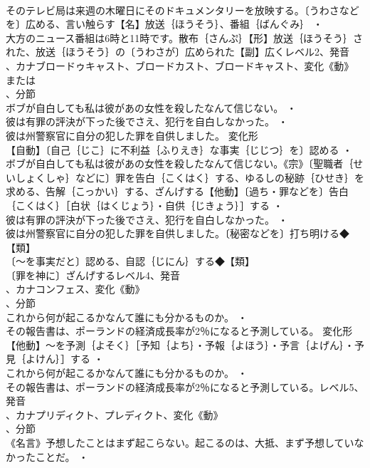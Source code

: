 \documentclass[8pt]{extreport}
\begin{document}
\begin{CJK}{UTF8}{min}
\\	そのテレビ局は来週の木曜日にそのドキュメンタリーを放映する。〔うわさなどを〕広める、言い触らす【名】放送｛ほうそう｝、番組｛ばんぐみ｝ ・
\\	大方のニュース番組は6時と11時です。散布｛さんぷ｝【形】放送｛ほうそう｝された、放送｛ほうそう｝の〔うわさが〕広められた【副】広くレベル2、発音
\\	、カナブロードゥキャスト、ブロードカスト、ブロードキャスト、変化《動》
\\	または
\\	、分節
\\	ボブが自白しても私は彼があの女性を殺したなんて信じない。 ・
\\	彼は有罪の評決が下った後でさえ、犯行を自白しなかった。 ・
\\	彼は州警察官に自分の犯した罪を自供しました。	変化形 
\\	【自動】〔自己｛じこ｝に不利益｛ふりえき｝な事実｛じじつ｝を〕認める ・
\\	ボブが自白しても私は彼があの女性を殺したなんて信じない。《宗》〔聖職者｛せいしょくしゃ｝などに〕罪を告白｛こくはく｝する、ゆるしの秘跡｛ひせき｝を求める、告解｛こっかい｝する、ざんげする【他動】〔過ち・罪などを〕告白｛こくはく｝［白状｛はくじょう｝・自供｛じきょう｝］する ・
\\	彼は有罪の評決が下った後でさえ、犯行を自白しなかった。 ・
\\	彼は州警察官に自分の犯した罪を自供しました。〔秘密などを〕打ち明ける◆【類】
\\	〔～を事実だと〕認める、自認｛じにん｝する◆【類】
\\	〔罪を神に〕ざんげするレベル4、発音
\\	、カナコンフェス、変化《動》
\\	、分節
\\	これから何が起こるかなんて誰にも分かるものか。 ・
\\	その報告書は、ポーランドの経済成長率が2％になると予測している。	変化形 
\\	【他動】～を予測｛よそく｝［予知｛よち｝・予報｛よほう｝・予言｛よげん｝・予見｛よけん｝］する ・
\\	これから何が起こるかなんて誰にも分かるものか。 ・
\\	その報告書は、ポーランドの経済成長率が2％になると予測している。レベル5、発音
\\	、カナプリディクト、プレディクト、変化《動》
\\	、分節
\\	《名言》予想したことはまず起こらない。起こるのは、大抵、まず予想していなかったことだ。 ・

\end{CJK}
\end{document}

